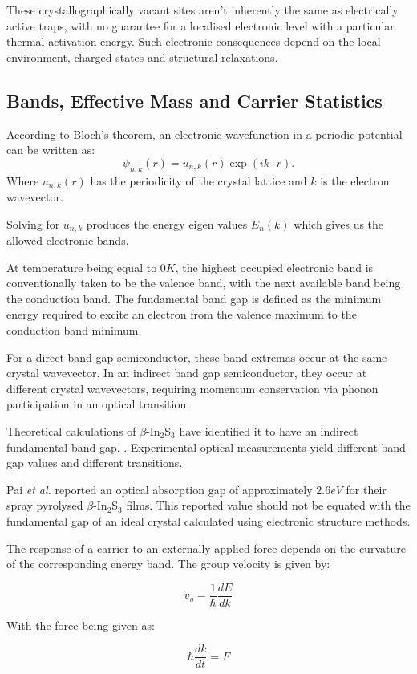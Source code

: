 \documentclass[letterpaper, 10pt, conference]{ieeeconf}
\begin{document}
These crystallographically vacant sites aren't inherently the same as electrically active traps, with no guarantee for a localised electronic level with a particular thermal activation energy. Such electronic consequences depend on the local environment, charged states and structural relaxations.

\subsection{Bands, Effective Mass and Carrier Statistics}
According to Bloch's theorem, an electronic wavefunction in a periodic potential can be written as:
$$ \psi_{n,k}(r)=u_{n,k}(r)\exp{(i k \cdot r)}. $$
Where $u_{n,k}(r)$ has the periodicity of the crystal lattice and $k$ is the electron wavevector.

Solving for $u_{n,k}$ produces the energy eigen values $E_n(k)$ which gives us the allowed electronic bands.

At temperature being equal to $0K$, the highest occupied electronic band is conventionally taken to be the valence band, with the next available band being the conduction band. The fundamental band gap is defined as the minimum energy required to excite an electron from the valence maximum to the conduction band minimum.

For a direct band gap semiconductor, these band extremas occur at the same crystal wavevector. In an indirect band gap semiconductor, they occur at different crystal wavevectors, requiring momentum conservation via phonon participation in an optical transition.

Theoretical calculations of $\beta$-In$_2$S$_3$ have identified it to have an indirect fundamental band gap. \cite{zhao}. Experimental optical measurements yield different band gap values and different transitions.

{Pai \emph{et al.}}\cite{pai} reported an optical absorption gap of approximately $2.6 eV$ for their spray pyrolysed $\beta$-In$_2$S$_3$ films. This reported value should not be equated with the fundamental gap of an ideal crystal calculated using electronic structure methods.

The response of a carrier to an externally applied force depends on the curvature of the corresponding energy band. The group velocity is given by:

$$ v_g = \frac{1}{\hbar} \frac{dE}{dk}$$

With the force being given as:

$$ \hbar \frac{dk}{dt} = F $$
\end{document}
